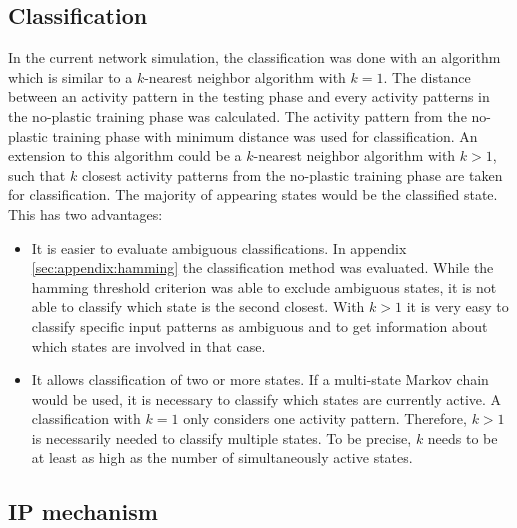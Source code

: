 \subsection{Classification}

In the current network simulation, the classification was done with an algorithm which is similar to a $k$-nearest neighbor algorithm with $k = 1$. The distance between an activity pattern in the testing phase and every activity patterns in the no-plastic training phase was calculated. The activity pattern from the no-plastic training phase with minimum distance was used for classification. An extension to this algorithm could be a $k$-nearest neighbor algorithm with $k > 1$, such that $k$ closest activity patterns from the no-plastic training phase are taken for classification. The majority of appearing states would be the classified state. This has two advantages:

\begin{itemize}
\item It is easier to evaluate ambiguous classifications. In appendix \ref{sec:appendix:hamming} the classification method was evaluated. While the hamming threshold criterion was able to exclude ambiguous states, it is not able to classify which state is the second closest. With $k > 1$ it is very easy to classify specific input patterns as ambiguous and to get information about which states are involved in that case.
\item It allows classification of two or more states. If a multi-state Markov chain would be used, it is necessary to classify which states are currently active. A classification with $k = 1$ only considers one activity pattern. Therefore, $k>1$ is necessarily needed to classify multiple states. To be precise, $k$ needs to be at least as high as the number of simultaneously active states.
\end{itemize}

\subsection{IP mechanism}
\label{sec:discuss-ip}

